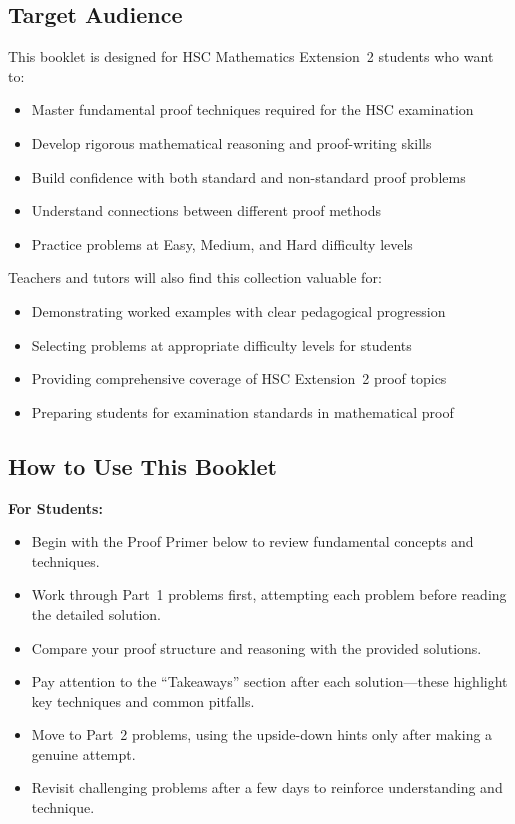 \documentclass[12pt]{article}
\begin{document}
\subsection{Target Audience}
This booklet is designed for HSC Mathematics Extension~2 students who want to:
\begin{itemize}[leftmargin=*]
  \item Master fundamental proof techniques required for the HSC examination
  \item Develop rigorous mathematical reasoning and proof-writing skills
  \item Build confidence with both standard and non-standard proof problems
  \item Understand connections between different proof methods
  \item Practice problems at Easy, Medium, and Hard difficulty levels
\end{itemize}

Teachers and tutors will also find this collection valuable for:
\begin{itemize}[leftmargin=*]
  \item Demonstrating worked examples with clear pedagogical progression
  \item Selecting problems at appropriate difficulty levels for students
  \item Providing comprehensive coverage of HSC Extension~2 proof topics
  \item Preparing students for examination standards in mathematical proof
\end{itemize}

\subsection{How to Use This Booklet}
\textbf{For Students:}
\begin{itemize}[leftmargin=*]
  \item Begin with the Proof Primer below to review fundamental concepts and techniques.
  \item Work through Part~1 problems first, attempting each problem before reading the detailed solution.
  \item Compare your proof structure and reasoning with the provided solutions.
  \item Pay attention to the ``Takeaways'' section after each solution---these highlight key techniques and common pitfalls.
  \item Move to Part~2 problems, using the upside-down hints only after making a genuine attempt.
  \item Revisit challenging problems after a few days to reinforce understanding and technique.
\end{itemize}
\end{document}
